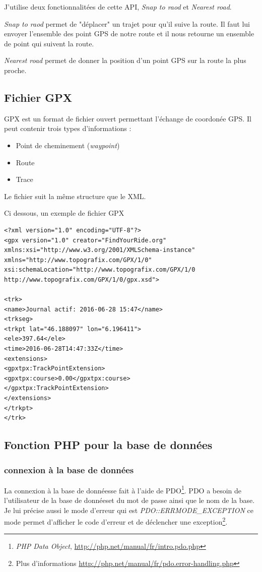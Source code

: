 \documentclass[a4paper]{article}
\newcommand{\bdd}{base de données}
\begin{document}
J'utilise deux fonctionnalitées de cette API, \emph{Snap to raod} et \emph{Nearest road}.

\emph{Snap to raod} permet de "déplacer" un trajet pour qu'il suive la route. Il faut lui envoyer l'ensemble des point GPS de notre route et il nous retourne un ensemble de point qui suivent la route.

\emph{Nearest road} permet de donner la position d'un point GPS sur la route la plus proche.

\subsection{Fichier GPX}
GPX est un format de fichier ouvert permettant l'échange de coordonée GPS. Il peut contenir trois types d'informations : 

\begin{itemize}
	\item Point de cheminement (\emph{waypoint})
	\item Route
	\item Trace
\end{itemize}

Le fichier suit la même structure que le XML.

Ci dessous, un exemple de fichier GPX

\begin{lstlisting}[frame=single] 
<?xml version="1.0" encoding="UTF-8"?>
<gpx version="1.0" creator="FindYourRide.org" xmlns:xsi="http://www.w3.org/2001/XMLSchema-instance" xmlns="http://www.topografix.com/GPX/1/0" xsi:schemaLocation="http://www.topografix.com/GPX/1/0 http://www.topografix.com/GPX/1/0/gpx.xsd">

<trk>
<name>Journal actif: 2016-06-28 15:47</name>
<trkseg>
<trkpt lat="46.188097" lon="6.196411">
<ele>397.64</ele>
<time>2016-06-28T14:47:33Z</time>
<extensions>
<gpxtpx:TrackPointExtension>
<gpxtpx:course>0.00</gpxtpx:course>
</gpxtpx:TrackPointExtension>
</extensions>
</trkpt>
</trk>

\end{lstlisting}


\subsection{Fonction PHP pour la \bdd}
\subsubsection{connexion à la \bdd}
La connexion à la \bdd se fait à l'aide de PDO\footnote{\emph{PHP Data Object}, \url{http://php.net/manual/fr/intro.pdo.php}}. PDO a besoin de l'utilisateur de la \bdd et du mot de passe ainsi que le nom de la base.
Je lui précise aussi le mode d'erreur qui est \emph{PDO::ERRMODE\_EXCEPTION} ce mode permet d'afficher le code d'erreur et de déclencher une exception\footnote{Plus d'informations \url{http://php.net/manual/fr/pdo.error-handling.php}}.
\end{document}
